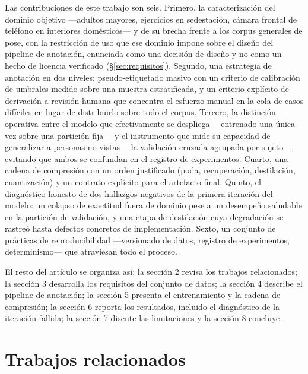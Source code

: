 \documentclass[10pt,a4paper,twocolumn]{article}
\begin{document}
Las contribuciones de este trabajo son seis. Primero, la caracterización del
dominio objetivo ---adultos mayores, ejercicios en sedestación, cámara
frontal de teléfono en interiores domésticos--- y de su brecha frente a los
corpus generales de pose, con la restricción de uso que ese dominio impone
sobre el diseño del pipeline de anotación, enunciada como una decisión de
diseño y no como un hecho de licencia verificado (\S\ref{sec:requisitos}).
Segundo, una estrategia de anotación en dos niveles: pseudo-etiquetado masivo
con un criterio de calibración de umbrales medido sobre una muestra
estratificada, y un criterio explícito de derivación a revisión humana que
concentra el esfuerzo manual en la cola de casos difíciles en lugar de
distribuirlo sobre todo el corpus. Tercero, la distinción operativa entre el
modelo que efectivamente se despliega ---entrenado una única vez sobre una
partición fija--- y el instrumento que mide su capacidad de generalizar a
personas no vistas ---la validación cruzada agrupada por sujeto---, evitando
que ambos se confundan en el registro de experimentos. Cuarto, una cadena de
compresión con un orden justificado (poda, recuperación, destilación,
cuantización) y un contrato explícito para el artefacto final. Quinto, el
diagnóstico honesto de dos hallazgos negativos de la primera iteración del
modelo: un colapso de exactitud fuera de dominio pese a un desempeño
saludable en la partición de validación, y una etapa de destilación cuya
degradación se rastreó hasta defectos concretos de implementación. Sexto, un
conjunto de prácticas de reproducibilidad ---versionado de datos, registro de
experimentos, determinismo--- que atraviesan todo el proceso.

El resto del artículo se organiza así: la sección 2 revisa los trabajos
relacionados; la sección 3 desarrolla los requisitos del conjunto de datos;
la sección 4 describe el pipeline de anotación; la sección 5 presenta el
entrenamiento y la cadena de compresión; la sección 6 reporta los resultados,
incluido el diagnóstico de la iteración fallida; la sección 7 discute las
limitaciones y la sección 8 concluye.

\section{Trabajos relacionados}
\end{document}
